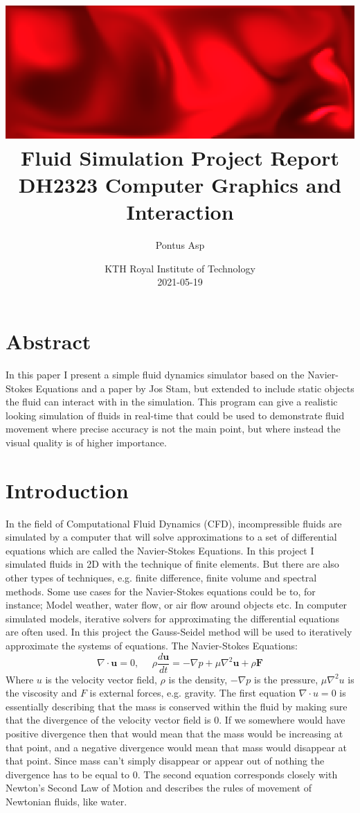 \documentclass{article}
\title{%
\vspace*{-2em}
\includegraphics[width=\linewidth]{top}\\%
\textbf{Fluid Simulation Project Report}\\%
\large DH2323 Computer Graphics and Interaction}
\author{Pontus Asp}
\date{%
KTH Royal Institute of Technology\\%
2021-05-19}
\begin{document}
\maketitle
\begin{multicols}{2}

\section*{Abstract}
In this paper I present a simple fluid dynamics simulator based on the Navier-Stokes Equations and a paper by Jos Stam, but extended to include static objects the fluid can interact with in the simulation. This program can give a realistic looking simulation of fluids in real-time that could be used to demonstrate fluid movement where precise accuracy is not the main point, but where instead the visual quality is of higher importance.

\section{Introduction}
In the field of Computational Fluid Dynamics (CFD), incompressible fluids are simulated by a computer that will solve approximations to a set of differential equations which are called the Navier-Stokes Equations. In this project I simulated fluids in 2D with the technique of finite elements. But there are also other types of techniques, e.g. finite difference, finite volume and spectral methods. Some use cases for the Navier-Stokes equations could be to, for instance; Model weather, water flow, or air flow around objects etc. In computer simulated models, iterative solvers for approximating the differential equations are often used. In this project the Gauss-Seidel method will be used to iteratively approximate the systems of equations. The Navier-Stokes Equations:
\[
    \nabla \cdot \bm{u}=0,~~~~~~
    \rho\frac{d\bm{u}}{dt}=-\nabla p+\mu\nabla^2\bm{u}+\rho \bm{F}
\]
Where $u$ is the velocity vector field, $\rho$ is the density, $-\nabla p$ is the pressure, $\mu \nabla^2u$ is the viscosity and $F$ is external forces, e.g. gravity. The first equation $\nabla \cdot u=0$ is essentially describing that the mass is conserved within the fluid by making sure that the divergence of the velocity vector field is $0$. If we somewhere would have positive divergence then that would mean that the mass would be increasing at that point, and a negative divergence would mean that mass would disappear at that point. Since mass can't simply disappear or appear out of nothing the divergence has to be equal to $0$. The second equation corresponds closely with Newton's Second Law of Motion and describes the rules of movement of Newtonian fluids, like water. \cite{vcubingx}


\end{multicols}
\end{document}
